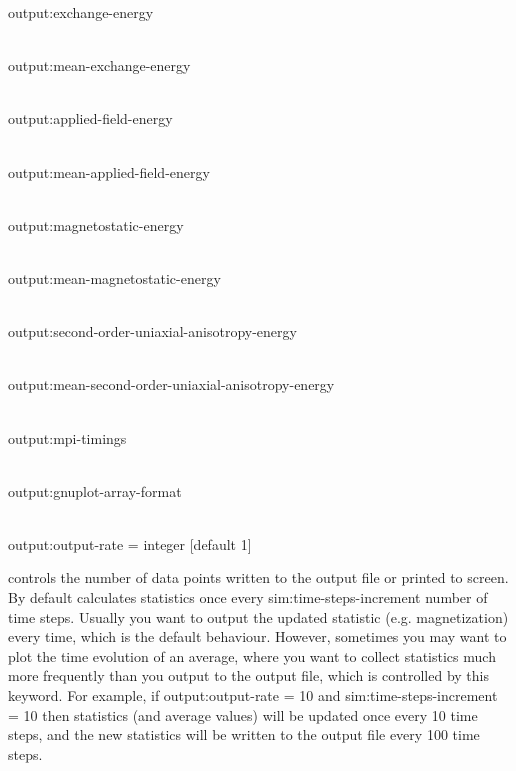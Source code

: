 {\zicf output:exchange-energy}\\

{\zicf output:mean-exchange-energy}\\

{\zicf output:applied-field-energy}\\

{\zicf output:mean-applied-field-energy}\\

{\zicf output:magnetostatic-energy}\\

{\zicf output:mean-magnetostatic-energy}\\

{\zicf output:second-order-uniaxial-anisotropy-energy}\\

{\zicf output:mean-second-order-uniaxial-anisotropy-energy}\\

{\zicf output:mpi-timings}\\

{\zicf output:gnuplot-array-format}\\

{\zicf output:output-rate = integer [default 1]} controls the number of data points written to the output file or printed to screen. By default \vampire calculates statistics once every sim:time-steps-increment number of time steps. Usually you want to output the updated statistic (e.g. magnetization) every time, which is the default behaviour. However, sometimes you may want to plot the time evolution of an average, where you want to collect statistics much more frequently than you output to the output file, which is controlled by this keyword. For example, if output:output-rate = 10 and sim:time-steps-increment = 10 then statistics (and average values) will be updated once every 10 time steps, and the new statistics will be written to the output file every 100 time steps.\\

